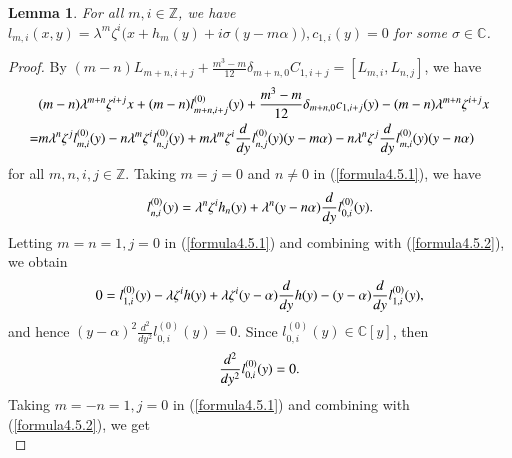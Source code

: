 \documentclass[12pt,reqno]{amsart}
\def\Z{\mathbb{Z}}
\def\C{\mathbb{C}}
\numberwithin{equation}{section}
\newtheorem{lemm}[theo]{Lemma}
\begin{document}
\begin{lemm}\label{le4.5}
For all $m,i\in\mathbb{Z}$, we have $l_{m,i}(x,y)=\lambda^m\zeta^i\big(x+h_m(y)+i\sigma(y-m\alpha)\big), c_{1,i}(y)=0$ for some $\sigma\in\C$.
\end{lemm}
\begin{proof}
  By $(m-n)L_{m+n,i+j}+\frac{m^3-m}{12}\delta_{m+n,0}C_{1,i+j} =[L_{m,i},L_{n,j}]$, we have
\begin{equation}\label{formula4.5.1}
\aligned
&(m-n)\lambda^{m+n}\zeta^{i+j}x+(m-n)l_{m+n,i+j}^{(0)}(y)+\frac{m^3-m}{12}\delta_{m+n,0}c_{1,i+j}(y)-(m-n)\lambda^{m+n}\zeta^{i+j}x
\\
=&m\lambda^n\zeta^{j}l_{m,i}^{(0)}(y)-n\lambda^m\zeta^{i}l_{n,j}^{(0)}(y)+m\lambda^m\zeta^{i}\frac{d}{d{y}}{l_{n,j}^{(0)}(y)}(y-m\alpha)-n\lambda^n\zeta^{j}\frac{d}{d{y}}{l_{m,i}^{(0)}(y)}(y-n\alpha)
\endaligned
\end{equation}
for all $m,n, i,j\in\Z$. Taking $m=j=0$ and $n\ne 0$ in (\ref{formula4.5.1}), we have
\begin{equation}\label{formula4.5.2}
\aligned
l_{n,i}^{(0)}(y)=\lambda^n\zeta^ih_n(y)+\lambda^n(y-n\alpha)   \frac{d}{d{y}}{l_{0,i}^{(0)}(y)}. 
\endaligned
\end{equation}
Letting $m=n=1,j=0$ in (\ref{formula4.5.1}) and combining with (\ref{formula4.5.2}), we obtain
\begin{equation*}\label{formula4.5.3}
\aligned
0=
  l_{1,i}^{(0)}(y)-\lambda \zeta^ih(y)
+\lambda \zeta^i(y-\alpha)\frac{d}{d{y}} h(y)- (y-\alpha)
\frac{d }{d y}l_{1,i}^{(0)}(y),
\endaligned
\end{equation*}
and hence $(y-\alpha)^2\frac{d^2}{d{y^2}}l_{0,i}^{(0)}(y)   =0$.
Since $l_{0,i}^{(0)}(y)\in\C[y]$, then
\begin{equation}\label{formula4.5.4}
\aligned
\frac{d^2}{d{y^2}}l_{0,i}^{(0)}(y)   =0.
\endaligned
\end{equation}
Taking $m=-n=1,j=0$ in (\ref{formula4.5.1}) and combining with (\ref{formula4.5.2}), we get
\begin{equation*}\label{formula4.5.5}

\end{equation*}
\end{proof}
\end{document}
